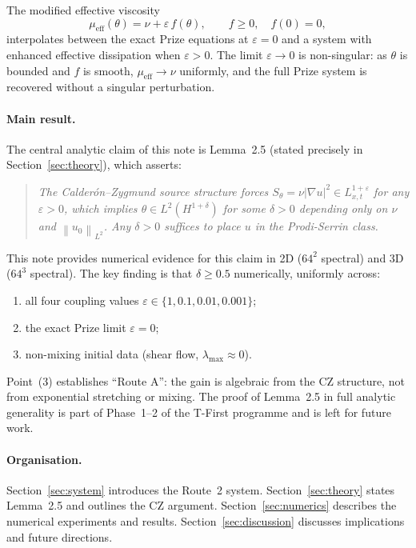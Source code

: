 \documentclass[11pt]{article}
\theoremstyle{definition}
\newcommand{\norm}[1]{\left\|#1\right\|}
\newcommand{\abs}[1]{\left|#1\right|}
\newcommand{\grad}{\nabla}
\newcommand{\eps}{\varepsilon}
\newcommand{\thetafield}{\theta}
\newcommand{\mueff}{\mu_{\mathrm{eff}}}
\begin{document}
The modified effective viscosity
\begin{equation}
  \mueff(\thetafield) = \nu + \eps \, f(\thetafield), \qquad f \geq 0, \quad f(0) = 0,
  \label{eq:mueff}
\end{equation}
interpolates between the exact Prize equations at $\eps = 0$ and a system with
enhanced effective dissipation when $\eps > 0$. The limit $\eps \to 0$ is
non-singular: as $\thetafield$ is bounded and $f$ is smooth, $\mueff \to \nu$
uniformly, and the full Prize system is recovered without a singular perturbation.

\paragraph{Main result.}
The central analytic claim of this note is Lemma~2.5 (stated precisely in
Section~\ref{sec:theory}), which asserts:

\begin{quotation}
\noindent
\textit{The Calder\'on--Zygmund source structure forces
$S_\theta = \nu \abs{\grad u}^2 \in L^{1+\eps}_{x,t}$ for any $\eps > 0$,
which implies $\thetafield \in L^2(H^{1+\delta})$ for some $\delta > 0$ depending
only on $\nu$ and $\norm{u_0}_{L^2}$. Any $\delta > 0$ suffices to place $u$ in the
Prodi-Serrin class.}
\end{quotation}

This note provides numerical evidence for this claim in 2D ($64^2$ spectral)
and 3D ($64^3$ spectral). The key finding is that $\delta \geq 0.5$ numerically,
uniformly across:
\begin{enumerate}[noitemsep]
  \item all four coupling values $\eps \in \{1, 0.1, 0.01, 0.001\}$;
  \item the exact Prize limit $\eps = 0$;
  \item non-mixing initial data (shear flow, $\lambda_{\max} \approx 0$).
\end{enumerate}
Point~(3) establishes ``Route A'': the gain is algebraic from the CZ structure,
not from exponential stretching or mixing. The proof of Lemma~2.5 in full analytic
generality is part of Phase~1--2 of the T-First programme and is left for future work.

\paragraph{Organisation.}
Section~\ref{sec:system} introduces the Route~2 system. Section~\ref{sec:theory}
states Lemma~2.5 and outlines the CZ argument. Section~\ref{sec:numerics} describes
the numerical experiments and results. Section~\ref{sec:discussion} discusses
implications and future directions.
\end{document}
